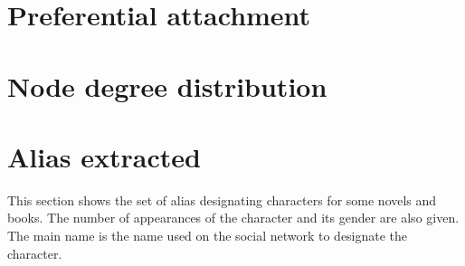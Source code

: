 \documentclass[a4paper, 12pt]{report}
\begin{document}
\begin{appendices}
\chapter{Preferential attachment}
\label{ref_attachement}
%




\chapter{Node degree distribution}
\label{a_degree}
%

\chapter{Alias extracted}
This section shows the set of alias designating characters for some novels and books.
The number of appearances of the character and its gender are also given.
The main name is the name used on the social network to designate the character.
\label{alias_extracted}
%

\end{appendices}
\end{document}
